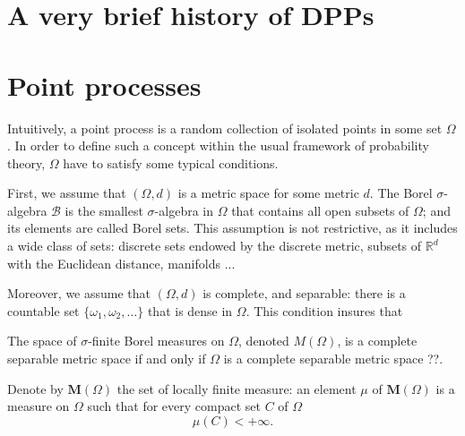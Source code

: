 \documentclass[twoside,11pt]{book}
\numberwithin{theorem}{chapter}
\numberwithin{definition}{chapter}
\numberwithin{proposition}{chapter}
\numberwithin{corollary}{chapter}
\numberwithin{example}{chapter}
\numberwithin{lemma}{chapter}
\begin{document}
\section{A very brief history of DPPs} 

\section{Point processes}\label{sec:pointprocesses}

Intuitively, a point process is a random collection of isolated points in some set $\Omega$. In order to define such a concept within the usual framework of probability theory, $\Omega$ have to satisfy some typical conditions. 

First, we assume that $(\Omega,d)$ is a metric space for some metric $d$. The Borel $\sigma$-algebra $\mathcal{B}$ is the smallest $\sigma$-algebra in $\Omega$ that contains all open subsets of $\Omega$; and its elements are called Borel sets. This assumption is not restrictive, as it includes a wide class of sets: discrete sets endowed by the discrete metric, subsets of $\mathbb{R}^{d}$ with the Euclidean distance, manifolds ... 

Moreover, we assume that $(\Omega,d)$ is complete, and separable: there is a countable set $\{\omega_{1}, \omega_{2}, \dots \}$ that is dense in $\Omega$. This condition insures that 



The space of $\sigma$-finite Borel measures on $\Omega$, denoted $M(\Omega)$, is a complete separable metric space if and only if $\Omega$ is a complete separable metric space \citep{Par05}??.


Denote by $\mathbf{M}(\Omega)$ the set of locally finite measure: an element $\mu$ of $\mathbf{M}(\Omega)$ is a measure on $\Omega$ such that for every compact set $C$ of $\Omega$
\begin{equation}
\mu(C) <+\infty.
\end{equation}
\end{document}
